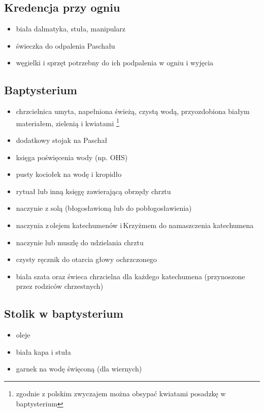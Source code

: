 \subsection{Kredencja przy ogniu}
\begin{itemize}
	\item biała dalmatyka, stuła, manipularz
	\item świeczka do odpalenia Paschału
	\item węgielki i sprzęt potrzebny do ich podpalenia w ogniu i wyjęcia
\end{itemize}

\subsection{Baptysterium}
\begin{itemize}
	\item chrzcielnica umyta, napełniona świeżą, czystą wodą, przyozdobiona
	      białym materiałem, zielenią i kwiatami \footnote{zgodnie z polskim zwyczajem
		      można obsypać kwiatami posadzkę w baptysterium}
	\item dodatkowy stojak na Paschał
	\item księga poświęcenia wody (np. OHS)
	\item pusty kociołek na wodę i kropidło
	\item rytuał lub inną księgę zawierającą obrzędy chrztu
	\item naczynie z solą (błogosławioną lub do pobłogosławienia)
	\item naczynia z olejem katechumenów i Krzyżmem do namaszczenia katechumena
	\item naczynie lub muszlę do udzielania chrztu
	\item czysty ręcznik do otarcia głowy ochrzczonego
	\item biała szata oraz świeca chrzcielna dla każdego katechumena
	      (przynoszone przez rodziców chrzestnych)
\end{itemize}

\subsection{Stolik w baptysterium}
\begin{itemize}
	\item oleje
	\item biała kapa i stuła
	\item garnek na wodę święconą (dla wiernych)
\end{itemize}

